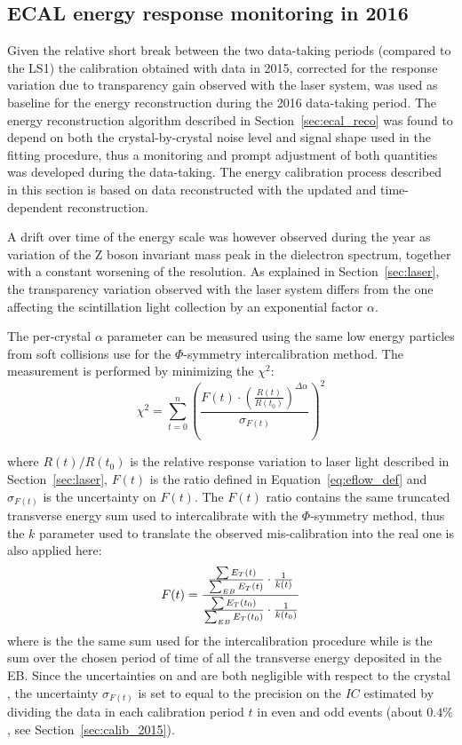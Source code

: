 \subsection{ECAL energy response monitoring in 2016}
\label{sec:calib_2016}
Given the relative short break between the two data-taking periods (compared to the LS1)
the calibration obtained with data in 2015, corrected for the response variation
due to transparency gain observed with the laser system, was used as baseline
for the energy reconstruction during the 2016 data-taking period.
The energy reconstruction algorithm described in Section~\ref{sec:ecal_reco} was found to depend on both
the crystal-by-crystal noise level and signal shape used in the fitting procedure, thus a monitoring and prompt adjustment
of both quantities was developed during the data-taking. The energy calibration process described in this section
is based on data reconstructed with the updated and time-dependent reconstruction. 

A drift over time of the energy scale was however observed during the year as variation of the Z boson
invariant mass peak in the dielectron spectrum, together with a constant worsening of the resolution.
As explained in Section~\ref{sec:laser}, the transparency variation observed with the laser system differs
from the one affecting the scintillation light collection by an exponential factor $\alpha$.

The per-crystal $\alpha$ parameter can be measured using the same low energy particles from soft collisions
use for the $\Phi$-symmetry intercalibration method. The measurement is performed by minimizing the $\chi^2$:
\begin{equation}
  \chi^2 = \sum_{t=0}^n \left( \frac{F(t) \cdot \left(\frac{R(t)}{R(t_0)}\right)^{\Delta\alpha}}{\sigma_{F(t)}} \right)^2
\end{equation}
\label{eq:chi2_fit_alpha}

where $R(t)/R(t_0)$ is the relative response variation to laser light described in Section~\ref{sec:laser},
$F(t)$ is the ratio defined in Equation~\ref{eq:eflow_def} and $\sigma_{F(t)}$ is the uncertainty on $F(t)$.
The $F(t)$ ratio contains the same truncated transverse energy sum used to intercalibrate with the $\Phi$-symmetry method, thus
the $k$ parameter used to translate the observed mis-calibration into the real one is also applied here:
\begin{equation}
F(t) = \frac{ \frac{\sum E_T(t)}{\sum_{EB} E_T(t)}  \cdot \frac{1}{k(t)}} { \frac{\sum E_T(t_0)}{\sum_{EB} E_T(t_0)}  \cdot \frac{1}{k(t_0)}}
\end{equation}
\label{eq:eflow_def}
where \sumEt is the the same sum used for the intercalibration procedure while \sumEtEB is the sum over the chosen period of time
of all the transverse energy deposited in the EB.
Since the uncertainties on \sumEtEB and \sumEtring are both negligible with respect to the crystal \sumEt,
the uncertainty $\sigma_{F(t)}$ is set to equal to the precision on the $IC$ estimated by dividing the data in each calibration
period $t$ in even and odd events (about $0.4\%$, see Section~\ref{sec:calib_2015}).

